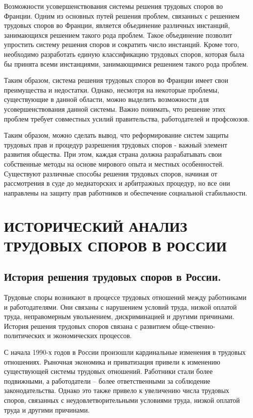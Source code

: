 Возможности усовершенствования системы решения трудовых споров во Франции. Одним из основных путей решения проблем, связанных с решением трудовых споров во Франции, является объединение различных инстанций, занимающихся решением такого рода проблем. Такое объединение позволит упростить систему решения споров и сократить число инстанций. Кроме того, необходимо разработать единую классификацию трудовых споров, которая была бы принята всеми инстанциями, занимающимися решением такого рода проблем. 

Таким образом, система решения трудовых споров во Франции имеет свои преимущества и недостатки. Однако, несмотря на некоторые проблемы, существующие в данной области, можно выделить возможности для усовершенствования данной системы. Важно понимать, что решение этих проблем требует совместных усилий правительства, работодателей и профсоюзов.

Таким образом, можно сделать вывод, что реформирование систем защиты трудовых прав и процедур разрешения трудовых споров - важный элемент развития общества. При этом, каждая страна должна разрабатывать свои собственные методы на основе мирового опыта и местных особенностей. Существуют различные способы решения трудовых споров, начиная от рассмотрения в суде до медиаторских и арбитражных процедур, но все они направлены на защиту прав работников и обеспечение социальной стабильности.

\chapter{ИСТОРИЧЕСКИЙ АНАЛИЗ ТРУДОВЫХ СПОРОВ В РОССИИ}
\section{История решения трудовых споров в России.}
Трудовые споры возникают в процессе трудовых отношений между работниками и работодателями. Они связаны с нарушением условий труда, низкой оплатой труда, неправомерным увольнением, дискриминацией и другими причинами. История решения трудовых споров связана с развитием обще-ственно-политических и экономических процессов.

С начала 1990-х годов в России произошли кардинальные изменения в трудовых отношениях. Рыночная экономика и приватизация привели к изменению существующей системы трудовых отношений. Работники стали более подвижными, а работодатели – более ответственными за соблюдение законодательства. Однако это также привело к увеличению числа трудовых споров, связанных с неудовлетворительными условиями труда, низкой оплатой труда и другими причинами.

